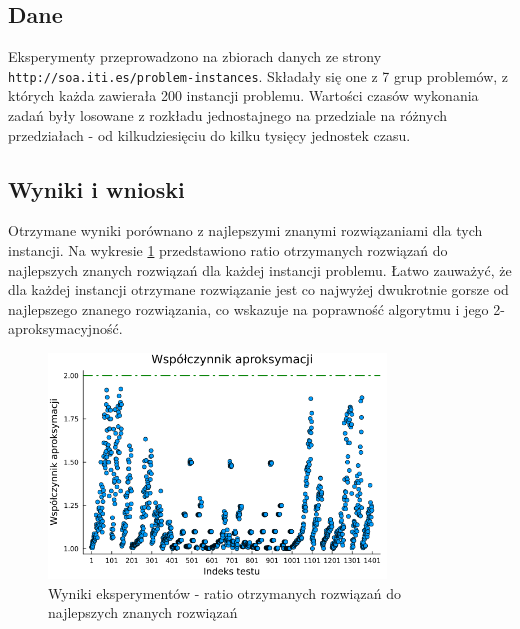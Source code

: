 \documentclass{article}
\begin{document}
\subsection{Dane}
Eksperymenty przeprowadzono na zbiorach danych ze strony \texttt{http://soa.iti.es/problem-instances}. Składały się one z 7 grup problemów, z których każda zawierała 200 instancji problemu.
Wartości czasów wykonania zadań były losowane z rozkładu jednostajnego na przedziale na różnych przedziałach - od kilkudziesięciu do kilku tysięcy jednostek czasu.

\subsection{Wyniki i wnioski}
Otrzymane wyniki porównano z najlepszymi znanymi rozwiązaniami dla tych instancji. 
Na wykresie \ref{fig:results} przedstawiono ratio otrzymanych rozwiązań do najlepszych znanych rozwiązań dla każdej instancji problemu.
Łatwo zauważyć, że dla każdej instancji otrzymane rozwiązanie jest co najwyżej dwukrotnie gorsze od najlepszego znanego rozwiązania, co wskazuje na poprawność algorytmu i jego 2-aproksymacyjność.

\begin{figure}[h]
    \centering
    \includegraphics[width=0.8\textwidth]{../approximation_ratio_plot.png}
    \caption{Wyniki eksperymentów - ratio otrzymanych rozwiązań do najlepszych znanych rozwiązań}
    \label{fig:results}
\end{figure}
\end{document}
